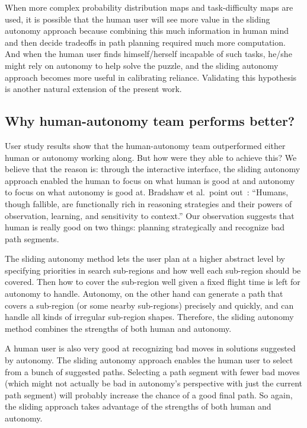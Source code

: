 When more complex probability distribution maps and task-difficulty maps are used, it is possible that the human user will see more value in the sliding autonomy approach because combining this much information in human mind and then decide tradeoffs in path planning required much more computation. And when the human user finds himself/herself incapable of such tasks, he/she might rely on autonomy to help solve the puzzle, and the sliding autonomy approach becomes more useful in calibrating reliance. Validating this hypothesis is another natural extension of the present work.

\subsection{Why human-autonomy team performs better?}

User study results show that the human-autonomy team outperformed either human or autonomy working along. But how were they able to achieve this? We believe that the reason is: through the interactive interface, the sliding autonomy approach enabled the human to focus on what human is good at and autonomy to focus on what autonomy is good at. Bradshaw et al.\ point out~\cite{Bradshaw2013Seven}: ``Humans, though fallible, are functionally rich in reasoning strategies and their powers of observation, learning, and sensitivity to context.'' Our observation suggests that human is really good on two things: planning strategically and recognize bad path segments.

The sliding autonomy method lets the user plan at a higher abstract level by specifying priorities in search sub-regions and how well each sub-region should be covered. Then how to cover the sub-region well given a fixed flight time is left for autonomy to handle. Autonomy, on the other hand can generate a path that covers a sub-region (or some nearby sub-regions) precisely and quickly, and can handle all kinds of irregular sub-region shapes. Therefore, the sliding autonomy method combines the strengths of both human and autonomy.

A human user is also very good at recognizing bad moves in solutions suggested by autonomy. The sliding autonomy approach enables the human user to select from a bunch of suggested paths. Selecting a path segment with fewer bad moves (which might not actually be bad in autonomy's perspective with just the current path segment) will probably increase the chance of a good final path. So again, the sliding approach takes advantage of the strengths of both human and autonomy.

